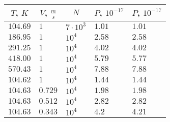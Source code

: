 \documentclass[12pt,twoside]{article}
\begin{document}
    \begin{table}[H]
        \centering
        \label{Table 1}
        \begin{tabular}{|l|l|l|l|l|}
            \hline
            \multicolumn{1}{|c|}{ $T$, $K$ } & \multicolumn{1}{c|}{$V$, $\frac{m}{s}$ } & \multicolumn{1}{c|}{$N$ } & \multicolumn{1}{c|}{$P$, $10^{-17}$ } & \multicolumn{1}{c|}{$P$, $10^{-17}$ }  \\
            \hline
            $104.69$                        & $1$                                       & $7\cdot 10^3$             & $1.01$                                & $1.01$                                 \\
            \hline
            $186.95$                         & $1$                                       & $10^4$                    & $2.58$                                & $2.58$                                 \\
            \hline
            $291.25$                         & $1$                                       & $10^4$                    & $4.02$                                & $4.02$                                 \\
            \hline
            $418.00$                         & $1$                                       & $10^4$                    & $5.79$                                & $5.77$                                 \\
            \hline
            $570.43$                         & $1$                                       & $10^4$                    & $7.88$                                & $7.88$                                 \\
            \hline
            $104.62$                         & $1$                                       & $10^4$                    & $1.44$                                & $1.44$                                 \\
            \hline
            $104.63$                         & $0.729$                                   & $10^4$                    & $1.98$                                & $1.98$                                 \\
            \hline
            $104.63$                         & $0.512$                                   & $10^4$                    & $2.82$                                & $2.82$                                 \\
            \hline
            $104.63$                         & $0.343$                                   & $10^4$                    & $4.2$                                 & $4.21$                                 \\

\end{tabular}
\end{table}
\end{document}
